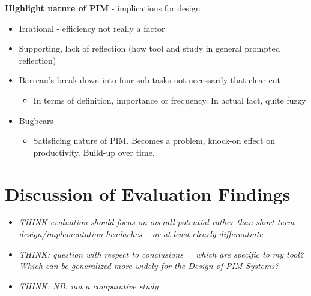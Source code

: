 \textbf{Highlight nature of PIM} - implications for design
\begin{itemize}
		\item Irrational - efficiency not really a factor
		\item Supporting, lack of reflection (how tool and study in general prompted reflection)
		\item Barreau's break-down into four sub-tasks not necessarily that clear-cut
		\begin{itemize}
			\item In terms of definition, importance or frequency. In actual fact, quite fuzzy
		\end{itemize}
		\item Bugbears
		\begin{itemize}
			\item Satisficing nature of PIM. Becomes a problem, knock-on effect on productivity. Build-up over time.	
		\end{itemize}
\end{itemize}



\section{Discussion of Evaluation Findings}
\label{ch7:evaluation-discussion}

\begin{itemize}
	\item \textit{THINK evaluation should focus on overall potential rather than short-term design/implementation headaches -- or at least clearly differentiate}
	\item \textit{THINK: question with respect to conclusions = which are specific to my tool? Which can be generalized more widely for the Design of PIM Systems?}
	\item \textit{THINK: NB: not a comparative study}
\end{itemize}


